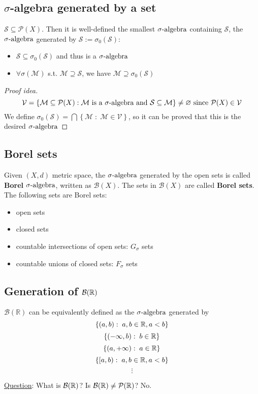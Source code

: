 \subsection{\texorpdfstring{\(\sigma\)}{sigma}-algebra generated by a set}
\begin{theorem}
    \(\mathcal{S} \subseteq \mathcal{P}(X)\). Then it is well-defined the smallest \(\sigma\mbox{-algebra}\) containing \(\mathcal{S}\), the \(\sigma\mbox{-algebra}\) generated by \(\mathcal{S} := \sigma_0(\mathcal{S})\):
    \begin{itemize}
        \item \(\mathcal{S} \subseteq \sigma_0(\mathcal{S})\) and thus is a \(\sigma\mbox{-algebra}\)
        \item \(\forall \sigma(\mathcal{M})\) s.t. \(\mathcal{M} \supseteq \mathcal{S}\), we have \(\mathcal{M} \supseteq \sigma_0(\mathcal{S})\)
    \end{itemize}
\end{theorem}
\begin{proof}[Proof idea]
    \[
        \mathcal{V} = \left\lbrace \mathcal{M} \subseteq \mathcal{P}(X): \mathcal{M} \mbox{ is a } \sigma\mbox{-algebra} \mbox{ and }\mathcal{S} \subseteq \mathcal{M}\right\rbrace \not = \varnothing \mbox{ since } \mathcal{P}(X) \in \mathcal{V}
    \]
    We define \(\sigma_0(\mathcal{S}) = \bigcap \left\lbrace \mathcal{M} \; : \; \mathcal{M} \in \mathcal{V}\right\rbrace\), so it can be proved that this is the desired \(\sigma\mbox{-algebra}\)
\end{proof}
\subsection{Borel sets}
Given \((X, d)\) metric space, the \(\sigma\mbox{-algebra}\) generated by the open sets is called \textbf{Borel} \(\sigma\mbox{-algebra}\), written as \(\mathcal{B}(X)\). The sets in \(\mathcal{B}(X)\) are called \textbf{Borel sets}. The following sets are Borel sets:
\begin{itemize}
    \item open sets
    \item closed sets
    \item countable intersections of open sets: \(G_{\sigma}\) sets
    \item countable unions of closed sets: \(F_{\sigma}\) sets
\end{itemize}
\subsection{Generation of \texorpdfstring{\(\mathcal{B}(\mathbb{R})\)}{B(R)}}
\begin{remark}
    \(\mathcal{B}(\mathbb{R})\) can be equivalently defined as the \(\sigma\mbox{-algebra}\) generated by 
    \[
        \left\lbrace (a,b): \; a,b \in \mathbb{R}, a < b \right\rbrace
    \]
    \[
        \left\lbrace (-\infty,b): \; b \in \mathbb{R} \right\rbrace
    \]
    \[
        \left\lbrace (a,+\infty ): \; a \in \mathbb{R} \right\rbrace
    \]
    \[
        \left\lbrace [a,b): \; a,b \in \mathbb{R}, a < b \right\rbrace
    \]
    \[
        \vdots
    \]
\end{remark}
\noindent\underline{Question}: What is \(\mathcal{B}(\mathbb{R})\)?
Is \(\mathcal{B}(\mathbb{R}) \not = \mathcal{P}(\mathbb{R})\)? No.
